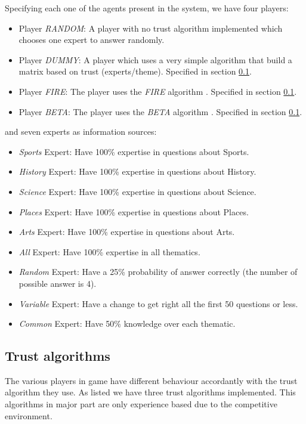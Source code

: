 \documentclass{llncs}
\begin{document}
Specifying each one of the agents present in the system, we have four players: 
\begin{itemize}
\item Player \textit{RANDOM}: A player with no trust algorithm implemented which chooses one expert to answer randomly. 
\item Player \textit{DUMMY}: A player which uses a very simple algorithm that build a matrix based on trust (experts/theme). Specified in section \ref{Trust}.
\item Player \textit{FIRE}: The player uses the \textit{FIRE} algorithm \cite{Fire}. Specified in section \ref{Trust}.
\item Player \textit{BETA}: The player uses the \textit{BETA} algorithm \cite{Beta}. Specified in section \ref{Trust}.
\end{itemize}
and seven experts as information sources:
\begin{itemize}
\item \textit{Sports} Expert: Have 100\% expertise in questions about Sports.
\item \textit{History} Expert: Have 100\% expertise in questions about History.
\item \textit{Science} Expert: Have 100\% expertise in questions about Science.
\item \textit{Places} Expert: Have 100\% expertise in questions about Places.
\item \textit{Arts} Expert: Have 100\% expertise in questions about Arts.
\item \textit{All} Expert: Have 100\% expertise in all thematics.
\item \textit{Random} Expert: Have a 25\% probability of answer correctly (the number of possible answer is 4).
\item \textit{Variable} Expert: Have a change to get right all the first 50 questions or less.
\item \textit{Common} Expert: Have 50\% knowledge over each thematic.
\end{itemize}

\subsection{Trust algorithms}\label{Trust}

The various players in game have different behaviour accordantly with the trust algorithm they use. As listed we have three trust algorithms implemented. This algorithms in major part are only experience based due to the competitive environment.
\end{document}
